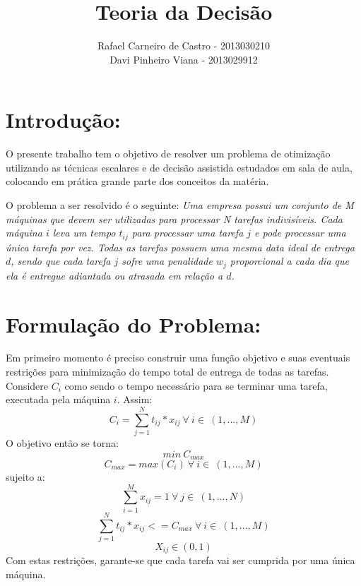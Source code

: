 \documentclass[12pt]{elsarticle}
\begin{document}
	\begin{frontmatter}

		\title{Teoria da Decisão\\ }
		\author{Rafael Carneiro de Castro - 2013030210\\
			Davi Pinheiro Viana - 2013029912}
		\address{Minas Gerais, Brasil}
		
	\end{frontmatter}
	
	\section{Introdução:}
	O presente trabalho tem o objetivo de resolver um problema de otimização utilizando as técnicas escalares e de decisão assistida estudados em sala de aula, colocando em prática grande parte dos conceitos da matéria.
	
	O problema a ser resolvido é o seguinte:
	\textit{Uma empresa possui um conjunto de M máquinas que devem ser utilizadas para processar N tarefas indivisíveis. Cada máquina $i$ leva um tempo $t_{ij}$ para processar uma tarefa $j$ e pode processar uma única tarefa por vez. Todas as tarefas possuem uma mesma data ideal de entrega $d$, sendo que cada tarefa $j$ sofre uma penalidade $w_j$ proporcional a cada dia que ela é entregue adiantada ou atrasada em relação a $d$.}
	
	\section{Formulação do Problema:}
	Em primeiro momento é preciso construir uma função objetivo e suas eventuais restrições para minimização do tempo total de entrega de todas as tarefas. Considere $C_i$ como sendo o tempo necessário para se terminar uma tarefa, executada pela máquina $i$. Assim:
	 \[C_i = \sum_{j=1}^{N}t_{ij}*x_{ij}\ \forall\ i \in\ (1,...,M) \]
	O objetivo então se torna:
	\[min\ C_{max} \]
	\[C_{max} = max(C_i)\ \forall\ i \in\ (1,...,M) \]
	sujeito a:
	\[\sum_{i=1}^{M}x_{ij}=1\ \forall\ j \in\ (1,...,N) \]
	\[\sum_{j=1}^{N}t_{ij}*x_{ij} <= C_{max}\ \forall\ i \in\ (1,...,M) \]
	\[X_{ij} \in (0, 1) \]
	Com estas restrições, garante-se que cada tarefa vai ser cumprida por uma única máquina.
	
	
\end{document}
